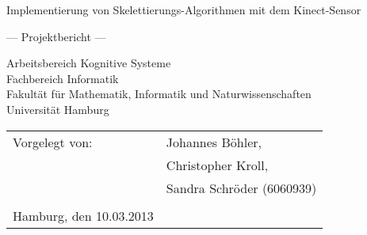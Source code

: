 \documentclass[
	12pt,
	a4paper,
	BCOR10mm,
	DIV14,
	listof=totoc,
	bibliography=totoc,
	headsepline
]{scrreprt}
\begin{document}
\begin{titlepage}
	\begin{center}
		{\titlefont\huge Implementierung von Skelettierungs-Algorithmen mit dem Kinect-Sensor\par}

		\bigskip
		\bigskip

		{\titlefont\Large --- Projektbericht ---\par}

		\bigskip
		\bigskip

		{\large Arbeitsbereich Kognitive Systeme\\
		Fachbereich Informatik\\
		Fakultät für Mathematik, Informatik und Naturwissenschaften\\
		Universität Hamburg\par}
	\end{center}
	
	\vfill
	
	{\large \begin{tabular}{ll}
		Vorgelegt von: & Johannes Böhler, \\
				& Christopher Kroll, \\ 
				& Sandra Schröder (6060939) \\\\
		Hamburg, den 10.03.2013
	  \end{tabular}\par}

\end{titlepage}

\newcommand{\Autor}[1]{{\hfill \Large \textit{Autor: #1}}}




\tableofcontents













% 
\end{document}
